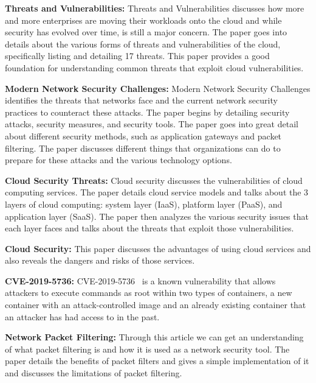 \textbf{Threats and Vulnerabilities: } Threats and Vulnerabilities discusses how more and more enterprises are moving their workloads onto the cloud and while
security has evolved over time, is still a major concern. The paper goes into details about the various forms
of threats and vulnerabilities of the cloud, specifically listing and detailing 17 threats. This paper
provides a good foundation for understanding common threats that exploit cloud vulnerabilities. \cite{ctv}

\textbf{Modern Network Security Challenges: } Modern Network Security Challenges identifies the threats that networks face and the current network security practices to counteract these attacks.
The paper begins by detailing security attacks, security measures, and security tools. The paper goes into great detail about
different security methods, such as application gateways and packet filtering. The paper discusses different things that organizations
can do to prepare for these attacks and the various technology options. \cite{mns}

\textbf{Cloud Security Threats: } Cloud security discusses the vulnerabilities of cloud computing services. The paper details cloud service models and talks about
the 3 layers of cloud computing: system layer (IaaS), platform layer (PaaS), and application layer (SaaS). The paper then analyzes
the various security issues that each layer faces and talks about the threats that exploit those vulnerabilities. \cite{stc}

\textbf{Cloud Security: } This paper discusses the advantages of using cloud services and also reveals the dangers and risks of those services. \cite{cs}

\textbf{CVE-2019-5736: } CVE-2019-5736~\cite{cve} is a known vulnerability that allows attackers to execute commands as root within two types of containers,
a new container with an attack-controlled image and an already existing container that an attacker has had access to in the past. \cite{cve}

\textbf{Network Packet Filtering: } Through this article we can get an understanding of what packet filtering is and how it is used as a network security tool.
The paper details the benefits of packet filters and gives a simple implementation of it and discusses
the limitations of packet filtering. \cite{tpf}
